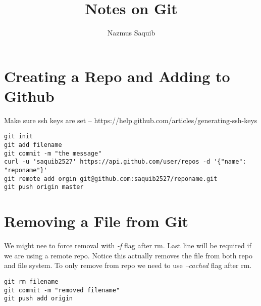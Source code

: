 \documentclass[a4paper, 12pt]{article}
\begin{document}
\title{Notes on Git}
\author{Nazmus Saquib}

\maketitle
\tableofcontents

\section{Creating a Repo and Adding to Github}
Make sure ssh keys are set -- https://help.github.com/articles/generating-ssh-keys
\begin{verbatim}
git init
git add filename
git commit -m "the message"
curl -u 'saquib2527' https://api.github.com/user/repos -d '{"name": "reponame"}'
git remote add orgin git@github.com:saquib2527/reponame.git
git push origin master
\end{verbatim}

\section{Removing a File from Git}
We might nee to force removal with \emph{-f} flag after rm. Last line will be required if we are using a remote repo. Notice this actually removes the file from both repo and file system. To only remove from repo we need to use \emph{--cached} flag after rm.
\begin{verbatim}
git rm filename
git commit -m "removed filename"
git push add origin
\end{verbatim}
\end{document}
